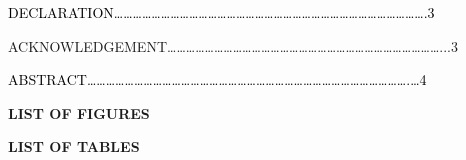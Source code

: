 \documentclass[a4paper]{article}
\begin{document}
\textcolor{black}{DECLARATION{\dots}{\dots}{\dots}{\dots}{\dots}{\dots}{\dots}{\dots}{\dots}{\dots}{\dots}{\dots}{\dots}{\dots}{\dots}{\dots}{\dots}{\dots}{\dots}{\dots}{\dots}{\dots}{\dots}{\dots}{\dots}{\dots}{\dots}{\dots}{\dots}{\dots}{\dots}{\dots}{\dots}.3}

ACKNOWLEDGEMENT{\dots}{\dots}{\dots}{\dots}{\dots}{\dots}{\dots}{\dots}{\dots}{\dots}{\dots}{\dots}{\dots}{\dots}{\dots}{\dots}{\dots}{\dots}{\dots}{\dots}{\dots}{\dots}{\dots}{\dots}{\dots}{\dots}{\dots}{\dots}{\dots}...3

\textcolor{black}{ABSTRACT{\dots}{\dots}{\dots}{\dots}{\dots}{\dots}{\dots}{\dots}{\dots}{\dots}{\dots}{\dots}{\dots}{\dots}{\dots}{\dots}{\dots}{\dots}{\dots}{\dots}{\dots}{\dots}{\dots}{\dots}{\dots}{\dots}{\dots}{\dots}{\dots}{\dots}{\dots}{\dots}{\dots}{\dots}.{\dots}4
}

\setcounter{tocdepth}{10}
\renewcommand\contentsname{}
\tableofcontents
\clearpage\setcounter{page}{1}\pagestyle{Convertedv}
{\centering
\textbf{LIST OF FIGURES}
\par}

\setcounter{tocdepth}{10}
\renewcommand\contentsname{}
\tableofcontents

\bigskip

\setcounter{tocdepth}{10}
\renewcommand\contentsname{}
\tableofcontents

\bigskip

\setcounter{tocdepth}{10}
\renewcommand\contentsname{}
\tableofcontents

\bigskip

\setcounter{tocdepth}{10}
\renewcommand\contentsname{}
\tableofcontents

\bigskip


\bigskip


\bigskip


\bigskip


\bigskip


\bigskip


\bigskip


\bigskip


\bigskip

{\centering
\textbf{LIST OF TABLES}
\par}

\setcounter{tocdepth}{10}
\renewcommand\contentsname{}
\tableofcontents

\bigskip


\bigskip


\bigskip


\bigskip
\end{document}
